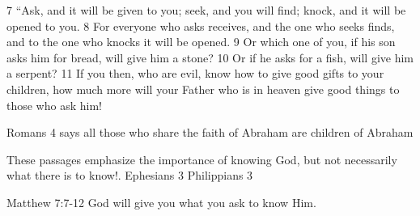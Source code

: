 \begin{bible}
7 ``Ask, and it will be given to you; seek, and you will find; knock, and it will be opened to you. 8 For everyone who asks receives, and the one who seeks finds, and to the one who knocks it will be opened. 9 Or which one of you, if his son asks him for bread, will give him a stone? 10 Or if he asks for a fish, will give him a serpent? 11 If you then, who are evil, know how to give good gifts to your children, how much more will your Father who is in heaven give good things to those who ask him!

\end{bible}

\begin{discussion}


Romans 4 says all those who share the faith of Abraham are children of Abraham


These passages emphasize the importance of knowing God, but not necessarily what there is to know!.
Ephesians 3
Philippians 3


Matthew 7:7-12 God will give you what you ask to know Him.

\end{discussion}
